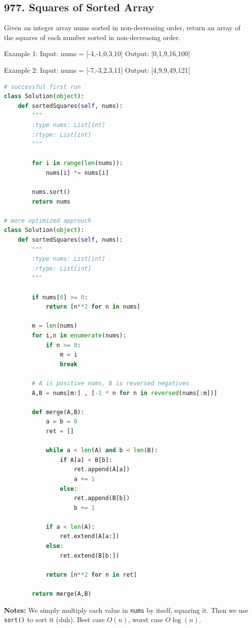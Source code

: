 \documentclass[11pt]{article}
\begin{document}
\subsection*{977. Squares of Sorted Array}
Given an integer array nums sorted in non-decreasing order, return an array of the squares of each number sorted in non-decreasing order. 

Example 1:
Input: nums = [-4,-1,0,3,10]
Output: [0,1,9,16,100]

Example 2:
Input: nums = [-7,-3,2,3,11]
Output: [4,9,9,49,121]

\begin{lstlisting}[language=python, mathescape=true]
# successful first run
class Solution(object):
    def sortedSquares(self, nums):
        """
        :type nums: List[int]
        :rtype: List[int]
        """

        for i in range(len(nums)):
            nums[i] *= nums[i]
        
        nums.sort()
        return nums

# more optimized approuch
class Solution(object):
    def sortedSquares(self, nums):
        """
        :type nums: List[int]
        :rtype: List[int]
        """

        if nums[0] >= 0:
            return [n**2 for n in nums]
        
        m = len(nums)
        for i,n in enumerate(nums):
            if n >= 0:
                m = i
                break
        
        # A is positive nums, B is reversed negatives
        A,B = nums[m:] , [-1 * n for n in reversed(nums[:m])]

        def merge(A,B):
            a = b = 0
            ret = []

            while a < len(A) and b < len(B):
                if A[a] < B[b]:
                    ret.append(A[a])
                    a += 1
                else:
                    ret.append(B[b])
                    b += 1
            
            if a < len(A):
                ret.extend(A[a:])
            else:
                ret.extend(B[b:])
            
            return [n**2 for n in ret]

        return merge(A,B)
\end{lstlisting}

\noindent \textbf{Notes:} We simply multiply each value in \texttt{nums} by itself, squaring it. Then we use \texttt{sort()} to sort it (duh). Best case $O(n)$, worst case $O \log (n)$.
\end{document}
